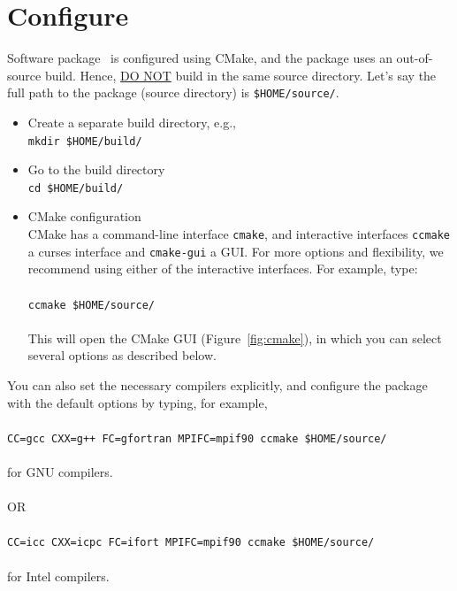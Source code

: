 \section{Configure}
\label{sec:configure}

Software package \pack\ is configured using CMake, and the package uses an out-of-source build. Hence, \underline{DO NOT} build in the same source directory. Let's say the full path to the package (source directory) is \texttt{\$HOME/source/\pack}.

\begin{itemize}
\item Create a separate build directory, e.g.,\\
\texttt{mkdir \$HOME/build/\pack}

\item Go to the build directory \\
\texttt{cd \$HOME/build/\pack}

\item CMake configuration \\
CMake has a command-line interface \texttt{cmake}, and interactive interfaces \texttt{ccmake} a curses interface and \texttt{cmake-gui} a GUI. For more options and flexibility, we recommend using either of the interactive interfaces. For example, type:\\
\\
\texttt{ccmake \$HOME/source/\pack} \\
\\
This will open the CMake GUI (Figure~\ref{fig:cmake}), in which you can select several options as described below.
\end{itemize}
You can also set the necessary compilers explicitly, and configure the package with the default options by typing, for example,\\
\\
\texttt{CC=gcc CXX=g++ FC=gfortran MPIFC=mpif90 ccmake \$HOME/source/\pack} \\
\\
for GNU compilers.\\
\\
OR\\
\\
\texttt{CC=icc CXX=icpc FC=ifort MPIFC=mpif90 ccmake \$HOME/source/\pack} \\
\\
for Intel compilers.


